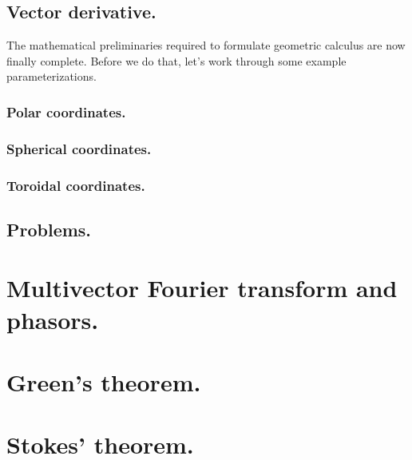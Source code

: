       \subsection{Vector derivative.}
         

The mathematical preliminaries required to formulate geometric calculus are now finally complete.
Before we do that, let's work through some example parameterizations.

      \subsubsection{Polar coordinates.}
         

      \subsubsection{Spherical coordinates.}
         

      \subsubsection{Toroidal coordinates.}
         

      \subsection{Problems.}
         
         

   \section{Multivector Fourier transform and phasors.}
      
   \section{Green's theorem.}
      
   \section{Stokes' theorem.}
